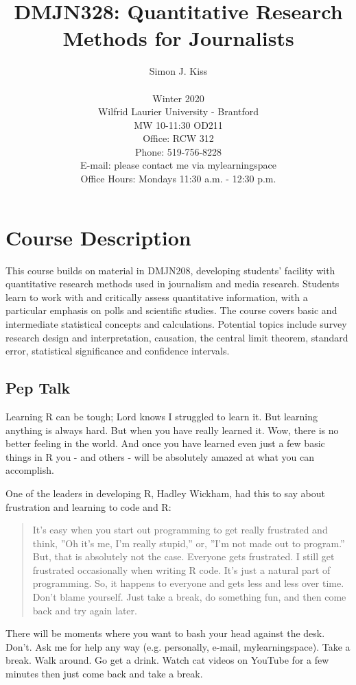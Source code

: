 \documentclass{article}
\title{DMJN328: Quantitative Research Methods for Journalists}
\author{Simon J. Kiss\\\\Winter 2020\\
Wilfrid Laurier University - Brantford\\
MW 10-11:30 OD211\\Office: RCW 312 \\
Phone: 519-756-8228\\
E-mail: please contact me via mylearningspace\\
Office Hours: Mondays 11:30 a.m. - 12:30 p.m.}
\date{}
\begin{document}
\maketitle
\begin{center}

\end{center}
\section*{Course Description}
This course builds on material in DMJN208, developing students’ facility with quantitative research methods used in journalism and media research. Students learn to work with and critically assess quantitative information, with a particular emphasis on polls and scientific studies. The course covers basic and intermediate statistical concepts and calculations. Potential topics include survey research design and interpretation, causation, the central limit theorem, standard error, statistical significance and confidence intervals.

\subsection*{Pep Talk}
Learning R can be tough; Lord knows I struggled to learn it. But learning anything is always hard. But when you have really learned it. Wow, there is no better feeling in the world.  And once you have learned even just a few basic things in R you - and others - will be absolutely amazed at what you can accomplish.

One of the leaders in developing R, Hadley Wickham, had this to say about frustration and learning to code and R: 

\begin{quote}
 It's easy when you start out programming to get really frustrated and think, ''Oh it's me, I'm really stupid,'' or, ''I'm not made out to program.'' But, that is absolutely not the case. Everyone gets frustrated. I still get frustrated occasionally when writing R code. It's just a natural part of programming. So, it happens to everyone and gets less and less over time. Don't blame yourself. Just take a break, do something fun, and then come back and try again later.
\end{quote}

There will be moments where you want to bash your head against the desk.  Don't. Ask me for help any way (e.g. personally, e-mail, mylearningspace). Take a break. Walk around. Go get a drink. Watch cat videos on YouTube for a few minutes then just come back and take a break.
\end{document}
